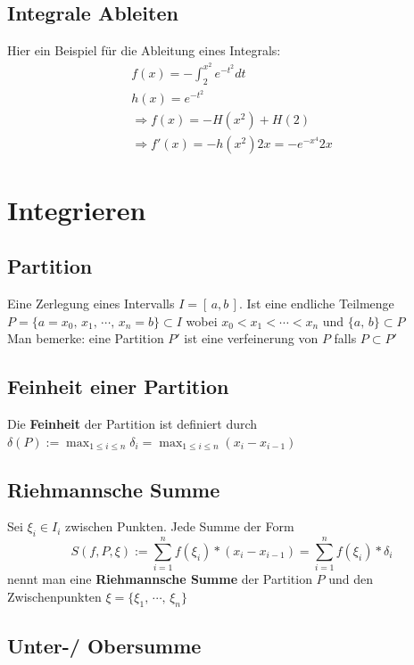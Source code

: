 \documentclass[8pt]{article}
\begin{document}
\begin{multicols*}{3}
\subsection{Integrale Ableiten}

Hier ein Beispiel für die Ableitung eines Integrals:
\begin{align*}
  f(x) = -\int_2^{x^2} e^{-t^2} dt\\
  h(x) = e^{-t^2}\\
  \Rightarrow f(x) = - H(x^2) + H(2)\\
  \Rightarrow f'(x) = - h(x^2) 2x = -e^{-x^4} 2x
\end{align*}
\section{Integrieren}
\hypertarget{sec:4}{}

\subsection{Partition}

Eine Zerlegung eines Intervalls $I = [\,a, b\,]$. Ist eine endliche Teilmenge
$P = \{a = x_0,\, x_1,\, \cdots,\, x_n = b\} \subset I$ wobei $x_0 < x_1 < \cdots < x_n$ und $\{a,\, b\} \subset P$
\\
Man bemerke: eine Partition $P'$ ist eine verfeinerung von $P$ falls $P \subset P'$

\subsection{Feinheit einer Partition}

Die \textbf{Feinheit} der Partition ist definiert durch $\delta(P) := \max_{1 \leq i \leq n} \delta_i = \max_{1 \leq i \leq n} (x_i - x_{i - 1})$

\subsection{Riehmannsche Summe}

Sei $\xi_i \in I_i$ zwischen Punkten. Jede Summe der Form
$$
  S(f, P, \xi) := \sum_{i = 1}^n f(\xi_i) * (x_i - x_{i - 1}) = \sum_{i = 1}^n f(\xi_i) * \delta_i
$$
nennt man eine \textbf{Riehmannsche Summe} der Partition $P$ und den Zwischenpunkten $\xi = \{\xi_1,\, \cdots,\, \xi_n\}$

\subsection{Unter-/ Obersumme}


\end{multicols*}
\end{document}
